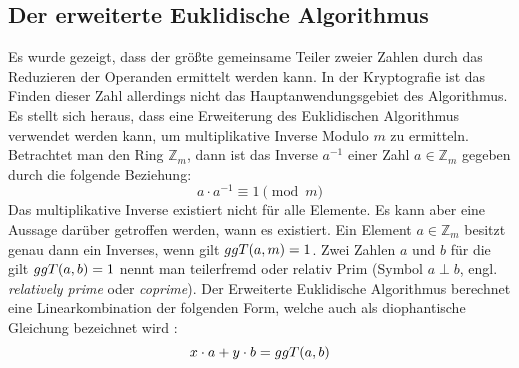 \subsection{Der erweiterte Euklidische Algorithmus}
Es wurde gezeigt, dass der größte gemeinsame Teiler zweier Zahlen durch
das Reduzieren der Operanden ermittelt werden kann. In der Kryptografie ist
das Finden dieser Zahl allerdings nicht das Hauptanwendungsgebiet des
Algorithmus. Es stellt sich heraus, dass eine Erweiterung des Euklidischen Algorithmus
verwendet werden kann, um multiplikative Inverse Modulo $m$ zu ermitteln.
Betrachtet man den Ring $\mathbb{Z}_m$, dann ist das Inverse $a^{-1}$
einer Zahl $a \in \mathbb{Z}_m$ gegeben durch die folgende Beziehung:
\begin{equation}
  \label{eq:inverse}
  a \cdot a^{-1} \equiv 1 \pmod{m}
\end{equation}
Das multiplikative Inverse existiert nicht für alle Elemente. Es kann aber eine Aussage
darüber getroffen werden, wann es existiert. Ein Element
$a \in \mathbb{Z}_m$ besitzt genau dann ein Inverses, wenn gilt $ggT(a,m) = 1$.
Zwei Zahlen $a$ und $b$ für die gilt $ggT(a,b) = 1$ nennt man teilerfremd oder
relativ Prim (Symbol $a \perp b$, engl. \textit{relatively prime} oder \textit{coprime}).
Der Erweiterte Euklidische Algorithmus berechnet eine Linearkombination der folgenden Form,
welche auch als diophantische Gleichung
bezeichnet wird \parencite[160]{BOOK:crypto} \parencite{SITE:diophant}:
\begin{equation}
  x \cdot a + y \cdot b = ggT(a,b)
\end{equation}

